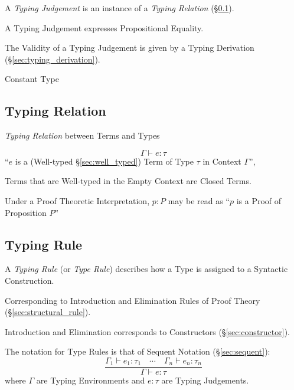 A \emph{Typing Judgement} is an instance of a \emph{Typing Relation}
(\S\ref{sec:typing_relation}).

A Typing Judgement expresses Propositional Equality. %

The Validity of a Typing Judgement is given by a Typing Derivation
(\S\ref{sec:typing_derivation}).

Constant Type %



\subsection{Typing Relation}\label{sec:typing_relation}

\emph{Typing Relation} between Terms and Types

\[
  \Gamma \vdash e : \tau
\]
``$e$ is a (Well-typed \S\ref{sec:well_typed}) Term of Type $\tau$ in
Context $\Gamma$'',

Terms that are Well-typed in the Empty Context are Closed Terms.

Under a Proof Theoretic Interpretation, $p : P$ may be read as ``$p$
is a Proof of Proposition $P$''



\subsection{Typing Rule}\label{sec:typing_rule}

A \emph{Typing Rule} (or \emph{Type Rule}) describes how a Type is
assigned to a Syntactic Construction.

Corresponding to Introduction and Elimination Rules of Proof Theory
(\S\ref{sec:structural_rule}).

Introduction and Elimination corresponds to Constructors
(\S\ref{sec:constructor}).

The notation for Type Rules is that of Sequent Notation
(\S\ref{sec:sequent}):
\[
  {
    \frac
    { \Gamma_1 \vdash e_1:\tau_1 \quad \cdots
      \quad \Gamma_n \vdash e_n:\tau_n }
    { \Gamma \vdash e:\tau }
  }
\]
where $\Gamma$ are Typing Environments and $e:\tau$ are Typing
Judgements.




